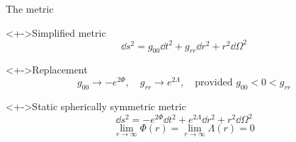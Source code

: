 \documentclass{beamer}
\let\svthefootnote\thefootnote
\newcommand\blankfootnote[1]{%
  \let\thefootnote\relax\footnotetext{#1}%
  \let\thefootnote\svthefootnote%
}
\begin{document}
\begin{frame}{The metric}

\begin{block}<+->{Simplified metric}
\begin{displaymath}
  \dd{s}^2 =
  g_{00} \dd{t}^2 +
  g_{rr} \dd{r}^2 +
  r^2 \dd\Omega^2
\end{displaymath}
\end{block}

\begin{block}<+->{Replacement}
\begin{displaymath}
  g_{00} \to -e^{2\Phi},
  \quad
  g_{rr} \to e^{2\Lambda},
  \quad
  \text{provided $g_{00} < 0 < g_{rr}$}
\end{displaymath}
\end{block}

\begin{block}<+->{Static spherically symmetric metric}
\begin{displaymath}
  \dd{s}^2 =
  -e^{2\Phi} \dd{t}^2 +
  e^{2\Lambda} \dd{r}^2 +
  r^2 \dd\Omega^2
\end{displaymath}
\begin{displaymath}
  \lim_{r\to\infty} \Phi(r) = \lim_{r\to\infty} \Lambda(r) = 0
\end{displaymath}
\end{block}

\blankfootnote{\textcite[pp. 258--259]{Schutz}}



\end{frame}
\end{document}
